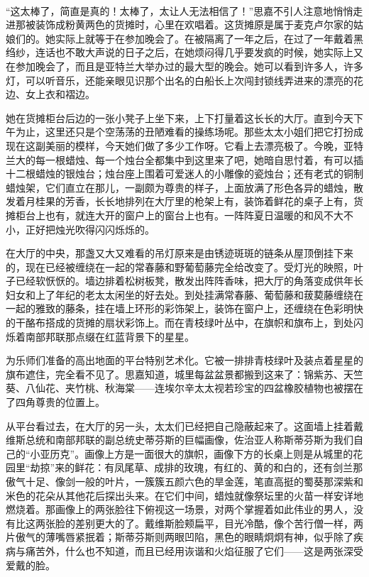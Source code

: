 \par  
\par “这太棒了，简直是真的！太棒了，太让人无法相信了！”思嘉不引人注意地悄悄走进那被装饰成粉黄两色的货摊时，心里在欢唱着。这货摊原是属于麦克卢尔家的姑娘们的。她实际上就等于在参加晚会了。在被隔离了一年之后，在过了一年戴着黑绉纱，连话也不敢大声说的日子之后，在她烦闷得几乎要发疯的时候，她实际上又在参加晚会了，而且是亚特兰大举办过的最大型的晚会。她可以看到许多人，许多灯，可以听音乐，还能亲眼见识那个出名的白船长上次闯封锁线弄进来的漂亮的花边、女上衣和褶边。
\par 她在货摊柜台后边的一张小凳子上坐下来，上下打量着这长长的大厅。直到今天下午为止，这里还只是个空荡荡的丑陋难看的操练场呢。那些太太小姐们把它打扮成现在这副美丽的模样，今天她们做了多少工作呀。它看上去漂亮极了。今晚，亚特兰大的每一根蜡烛、每一个烛台全都集中到这里来了吧，她暗自思忖着，有可以插十二根蜡烛的银烛台；烛台座上围着可爱迷人的小雕像的瓷烛台；还有老式的铜制蜡烛架，它们直立在那儿，一副颇为尊贵的样子，上面放满了形色各异的蜡烛，散发着月桂果的芳香，长长地排列在大厅里的枪架上有，装饰着鲜花的桌子上有，货摊柜台上也有，就连大开的窗户上的窗台上也有。一阵阵夏日温暖的和风不大不小，正好把烛光吹得闪闪烁烁的。
\par 在大厅的中央，那盏又大又难看的吊灯原来是由锈迹斑斑的链条从屋顶倒挂下来的，现在已经被缠绕在一起的常春藤和野葡萄藤完全给改变了。受灯光的映照，叶子已经软恹恹的。墙边排着松树板凳，散发出阵阵香味，把大厅的角落变成供年长妇女和上了年纪的老太太闲坐的好去处。到处挂满常春藤、葡萄藤和菝葜藤缠绕在一起的雅致的藤条，挂在墙上环形的彩饰架上，装饰在窗户上，还缠绕在色彩明快的干酪布搭成的货摊的扇状彩饰上。而在青枝绿叶丛中，在旗帜和旗布上，到处闪烁着南部邦联那点缀在红蓝背景下的星星。
\par 为乐师们准备的高出地面的平台特别艺术化。它被一排排青枝绿叶及装点着星星的旗布遮住，完全看不见了。思嘉知道，城里每盆盆景都搬到这来了：锦紫苏、天竺葵、八仙花、夹竹桃、秋海棠——连埃尔辛太太视若珍宝的四盆橡胶植物也被摆在了四角尊贵的位置上。
\par 从平台看过去，在大厅的另一头，太太们已经把自己隐蔽起来了。这面墙上挂着戴维斯总统和南部邦联的副总统史蒂芬斯的巨幅画像，佐治亚人称斯蒂芬斯为我们自己的“小亚历克”。画像上方是一面很大的旗帜，画像下方的长桌上则是从城里的花园里“劫掠”来的鲜花：有凤尾草、成排的玫瑰，有红的、黄的和白的，还有剑兰那傲气十足、像剑一般的叶片，一簇簇五颜六色的旱金莲，笔直高挺的蜀葵那深紫和米色的花朵从其他花后探出头来。在它们中间，蜡烛就像祭坛里的火苗一样安详地燃烧着。那画像上的两张脸往下俯视这一场景，对两个掌握着如此伟业的男人，没有比这两张脸的差别更大的了。戴维斯脸颊扁平，目光冷酷，像个苦行僧一样，两片傲气的薄嘴唇紧抿着；斯蒂芬斯则两眼凹陷，黑色的眼睛炯炯有神，似乎除了疾病与痛苦外，什么也不知道，而且已经用诙谐和火焰征服了它们——这是两张深受爱戴的脸。
